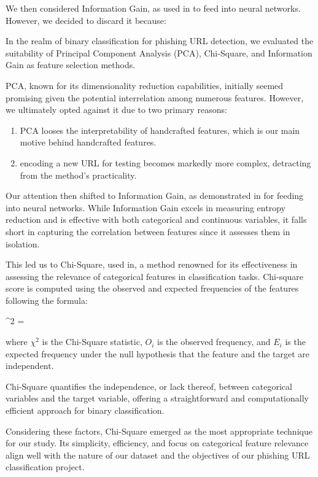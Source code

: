 \documentclass{article}
\begin{document}
    We then considered Information Gain, as used in\cite{EfficientDeepLearningPhishingDetection} to feed into neural networks.
    However, we decided to discard it because:

    In the realm of binary classification for phishing URL detection, we evaluated the suitability of Principal Component Analysis (PCA), Chi-Square, and Information Gain as feature selection methods.

    PCA, known for its dimensionality reduction capabilities, initially seemed promising given the potential interrelation among numerous features.
    However, we ultimately opted against it due to two primary reasons:
    \begin{enumerate}
        \item PCA looses the interpretability of handcrafted features, which is our main motive behind handcrafted features.
        \item encoding a new URL for testing becomes markedly more complex, detracting from the method's practicality.
    \end{enumerate}

    Our attention then shifted to Information Gain, as demonstrated in\cite{EfficientDeepLearningPhishingDetection} for feeding into neural networks.
    While Information Gain excels in measuring entropy reduction and is effective with both categorical and continuous variables, it falls short in capturing the correlation between features since it assesses them in isolation.

    This led us to Chi-Square, used in\cite{LexicalFeatureSelection}, a method renowned for its effectiveness in assessing the relevance of categorical features in classification tasks.
    Chi-square score is computed using the observed and expected frequencies of the features following the formula:
    \begin{e}
        \chi^2 = \sum {}
    \end{e}
    where \( \chi^2 \) is the Chi-Square statistic, \( O_i \) is the observed frequency, and \( E_i \) is the expected frequency under the null hypothesis that the feature and the target are independent.

    Chi-Square quantifies the independence, or lack thereof, between categorical variables and the target variable, offering a straightforward and computationally efficient approach for binary classification.

    Considering these factors, Chi-Square emerged as the most appropriate technique for our study.
    Its simplicity, efficiency, and focus on categorical feature relevance align well with the nature of our dataset and the objectives of our phishing URL classification project.
\end{document}
